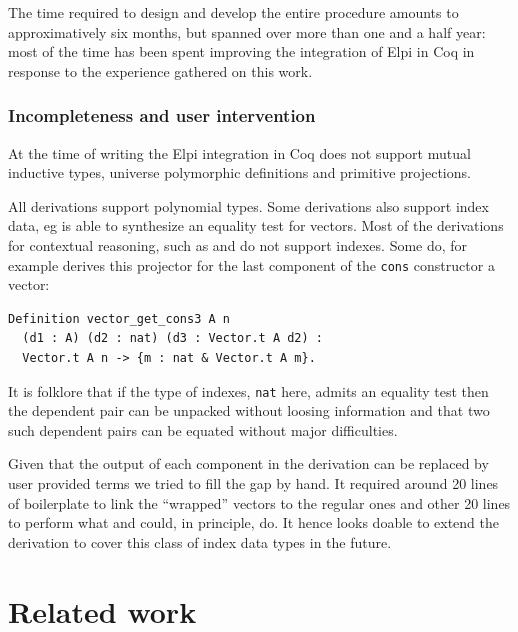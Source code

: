 \documentclass[sigplan,10pt,review]{acmart}\settopmatter{printfolios=true,printccs=false,printacmref=false}
\newcommand{\derive}[1]{\keys{#1}}
\begin{document}
The time required to design and develop the entire procedure amounts
to approximatively six months, but spanned over more than one and a
half year: most of the time has been spent improving the integration
of Elpi in Coq in response to the experience gathered on this work.

\subsubsection{Incompleteness and user intervention} %
\label{sec:oops}

At the time of writing the Elpi integration in Coq does not support
mutual inductive types, universe polymorphic definitions and primitive
projections.

All derivations support polynomial types.
Some derivations also support index data, eg \derive{eq} is able to
synthesize an equality test for vectors. Most of the derivations for
contextual reasoning, such as \derive{eqK} and \derive{bcongr} do not
support indexes.
Some do, for example \derive{projK} derives
this projector for the last component of the \lstinline+cons+
constructor a vector:

\begin{minipage}{\textwidth}\begin{lstlisting}
Definition vector_get_cons3 A n
  (d1 : A) (d2 : nat) (d3 : Vector.t A d2) :
  Vector.t A n -> {m : nat & Vector.t A m}.
\end{lstlisting}\end{minipage}

\noindent
It is folklore that if the type of indexes, \lstinline+nat+ here,
admits an equality test then the dependent pair can be unpacked
without loosing information and that two such dependent pairs can be
equated without major difficulties.

Given that the output of each component in the derivation can
be replaced by user provided terms we tried to fill the gap by
hand. It required around 20 lines of boilerplate to link the
``wrapped'' vectors to the regular ones and other 20 lines to
perform what \derive{bcongr} and \derive{eqK} could, in principle, do.
It hence looks doable to extend the derivation to cover this class of
index data types in the future.

\section{Related work} %
\label{sec:related}
\end{document}
